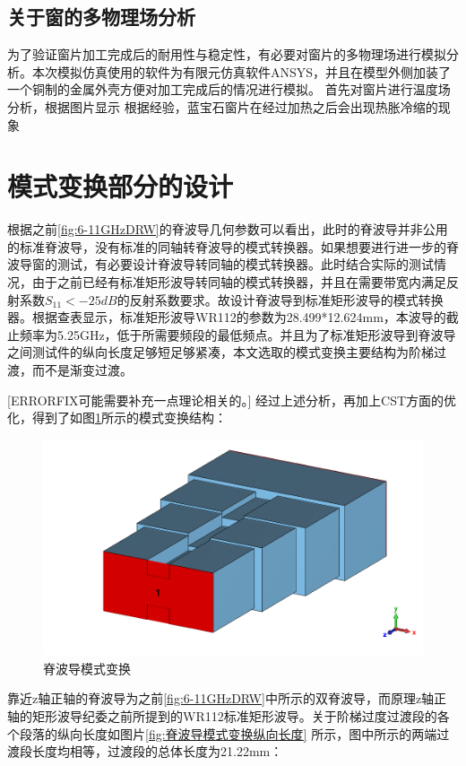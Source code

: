 \documentclass[master]{thesis-uestc}
\begin{document}
\subsection{关于窗的多物理场分析}
为了验证窗片加工完成后的耐用性与稳定性，有必要对窗片的多物理场进行模拟分析。本次模拟仿真使用的软件为有限元仿真软件ANSYS，并且在模型外侧加装了一个铜制的金属外壳方便对加工完成后的情况进行模拟。
首先对窗片进行温度场分析，根据图片显示
根据经验，蓝宝石窗片在经过加热之后会出现热胀冷缩的现象
\section{模式变换部分的设计}
根据之前\ref{fig:6-11GHzDRW}的脊波导几何参数可以看出，此时的脊波导并非公用的标准脊波导，没有标准的同轴转脊波导的模式转换器。如果想要进行进一步的脊波导窗的测试，有必要设计脊波导转同轴的模式转换器。此时结合实际的测试情况，由于之前已经有标准矩形波导转同轴的模式转换器，并且在需要带宽内满足反射系数$S_{11}<-25dB$的反射系数要求。故设计脊波导到标准矩形波导的模式转换器。根据查表显示，标准矩形波导WR112的参数为28.499*12.624mm，本波导的截止频率为5.25GHz，低于所需要频段的最低频点。并且为了标准矩形波导到脊波导之间测试件的纵向长度足够短足够紧凑，本文选取的模式变换主要结构为阶梯过渡，而不是渐变过渡。

[ERRORFIX可能需要补充一点理论相关的。]
经过上述分析，再加上CST方面的优化，得到了如图\ref{fig:脊波导模式变换}所示的模式变换结构：
\begin{figure}[!htb]
    \centering
    \includegraphics[width=0.5\linewidth]{pic/chapter3/脊波导模式变换.png}
    \caption{脊波导模式变换}
    \label{fig:脊波导模式变换}
\end{figure}
靠近z轴正轴的脊波导为之前\ref{fig:6-11GHzDRW}中所示的双脊波导，而原理z轴正轴的矩形波导纪委之前所提到的WR112标准矩形波导。关于阶梯过度过渡段的各个段落的纵向长度如图片\ref{fig:脊波导模式变换纵向长度} 所示，图中所示的两端过渡段长度均相等，过渡段的总体长度为21.22mm：
\end{document}
